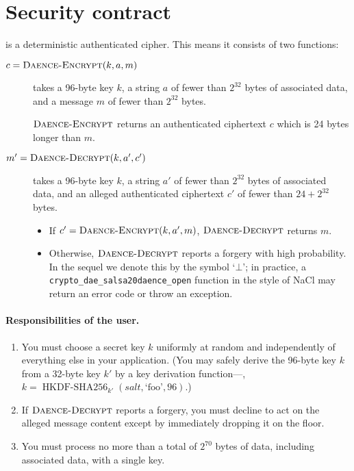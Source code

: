 \documentclass{article}
\def\operatorsc#1{{%
  \ifmmode\let\next=\operatorname\else\let\next=\relax\fi\next{\textsc{#1}}}}
\def\DAENCE/{\operatorsc{Daence}}
\def\NaCl/{NaCl}
\DeclareMathOperator{\DaenceEncrypt}{\textsc{Daence-Encrypt}}
\DeclareMathOperator{\DaenceDecrypt}{\textsc{Daence-Decrypt}}
\begin{document}
\section{Security contract}

\DAENCE/ is a deterministic authenticated cipher.
This means it consists of two functions:
%
\begin{description}
  \item[\normalfont $c = \DaenceEncrypt(k, a, m)$] takes a 96-byte key
     $k$, a string $a$ of fewer than $2^{32}$ bytes of associated
     data, and a message $m$ of fewer than $2^{32}$ bytes.

    $\DaenceEncrypt$ returns an authenticated ciphertext $c$ which is
     24 bytes longer than $m$.

  \item[\normalfont $m' = \DaenceDecrypt(k, a', c')$] takes a 96-byte
     key $k$, a string $a'$ of fewer than $2^{32}$ bytes of associated
     data, and an alleged authenticated ciphertext $c'$ of fewer than
     $24 + 2^{32}$ bytes.

    \begin{itemize}
      \item If $c' = \DaenceEncrypt(k, a', m)$, $\DaenceDecrypt$
         returns $m$.
      \item Otherwise, $\DaenceDecrypt$ reports a forgery with high
         probability.
        In the sequel we denote this by the symbol `$\bot$'; in
         practice, a \texttt{crypto\_dae\_salsa20daence\_open}
         function in the style of \NaCl/ may return an error code or
         throw an exception.
    \end{itemize}
\end{description}

\paragraph*{Responsibilities of the user.}

\begin{enumerate}
  \item You must choose a secret key $k$ uniformly at random and
     independently of everything else in your application.
    (You may safely derive the 96-byte key $k$ from a 32-byte key $k'$
     by a key derivation function---\eg,
     $k = \operatorname{HKDF-SHA256}_{k'}(\mathit{salt}, \text{`foo'},
      96)$.)

  \item If $\DaenceDecrypt$ reports a forgery, you must decline to act
     on the alleged message content except by immediately dropping it
     on the floor.

  \item You must process no more than a total of $2^{70}$ bytes of
     data, including associated data, with a single key.
\end{enumerate}
\end{document}
